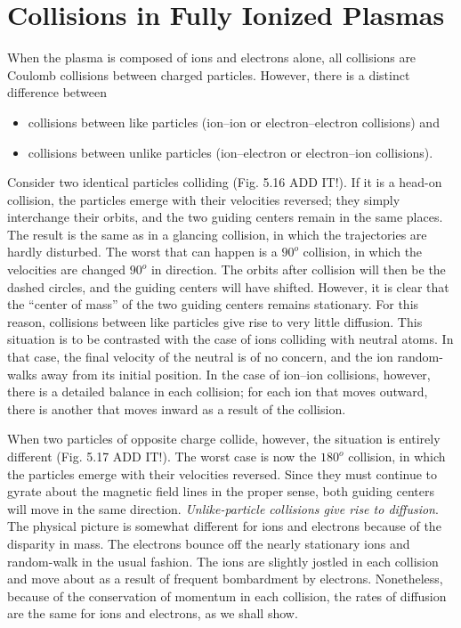 \documentclass[
  notoc %
]{tufte-book}
\providecommand{\tightlist}{%
  \setlength{\itemsep}{0pt}\setlength{\parskip}{0pt}
}
\begin{document}
\hypertarget{sec:collision_ionized}{%
\section{Collisions in Fully Ionized
Plasmas}\label{sec:collision_ionized}}

When the plasma is composed of ions and electrons alone, all collisions
are Coulomb collisions between charged particles. However, there is a
distinct difference between

\begin{itemize}
\tightlist
\item
  collisions between like particles (ion--ion or electron--electron
  collisions) and
\item
  collisions between unlike particles (ion--electron or electron--ion
  collisions).
\end{itemize}

Consider two identical particles colliding (Fig. 5.16 ADD IT!). If it is
a head-on collision, the particles emerge with their velocities
reversed; they simply interchange their orbits, and the two guiding
centers remain in the same places. The result is the same as in a
glancing collision, in which the trajectories are hardly disturbed. The
worst that can happen is a \(90^o\) collision, in which the velocities
are changed \(90^o\) in direction. The orbits after collision will then
be the dashed circles, and the guiding centers will have shifted.
However, it is clear that the ``center of mass'' of the two guiding
centers remains stationary. For this reason, collisions between like
particles give rise to very little diffusion. This situation is to be
contrasted with the case of ions colliding with neutral atoms. In that
case, the final velocity of the neutral is of no concern, and the ion
random-walks away from its initial position. In the case of ion--ion
collisions, however, there is a detailed balance in each collision; for
each ion that moves outward, there is another that moves inward as a
result of the collision.

When two particles of opposite charge collide, however, the situation is
entirely different (Fig. 5.17 ADD IT!). The worst case is now the
\(180^o\) collision, in which the particles emerge with their velocities
reversed. Since they must continue to gyrate about the magnetic field
lines in the proper sense, both guiding centers will move in the same
direction. \emph{Unlike-particle collisions give rise to diffusion}. The
physical picture is somewhat different for ions and electrons because of
the disparity in mass. The electrons bounce off the nearly stationary
ions and random-walk in the usual fashion. The ions are slightly jostled
in each collision and move about as a result of frequent bombardment by
electrons. Nonetheless, because of the conservation of momentum in each
collision, the rates of diffusion are the same for ions and electrons,
as we shall show.
\end{document}
